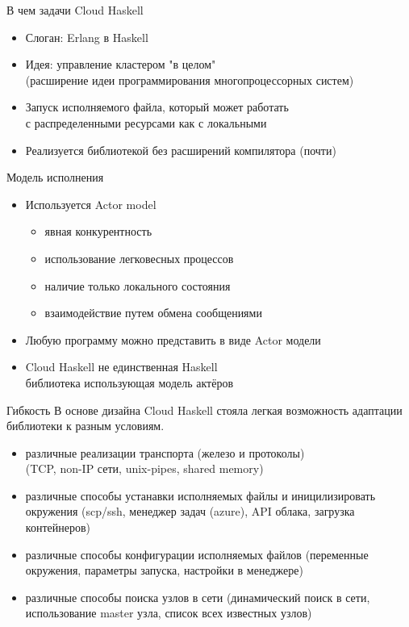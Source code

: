 \documentclass{beamer}
\begin{document}
\begin{frame}{В чем задачи Cloud Haskell}
  \begin{itemize}
    \item Слоган: Erlang в Haskell
    \item Идея: управление кластером "в целом" \\
          (расширение идеи программирования многопроцессорных систем)
    \item Запуск исполняемого файла, который может работать \\
          с распределенными ресурсами как с локальными
    \item Реализуется библиотекой без расширений компилятора (почти)
  \end{itemize}
\end{frame}

\begin{frame}{Модель исполнения}
  \begin{itemize}
    \item Используется Actor model
      \begin{itemize}
        \item явная конкурентность
        \item использование легковесных процессов
        \item наличие только локального состояния
        \item взаимодействие путем обмена сообщениями
      \end{itemize}
    \item Любую программу можно представить в виде Actor модели
    \item Cloud Haskell не единственная Haskell \\
          библиотека использующая модель актёров
  \end{itemize}
\end{frame}

\begin{frame}{Гибкость}
  В основе дизайна Cloud Haskell стояла легкая возможность
  адаптации библиотеки к разным условиям.
  \begin{itemize}
    \item различные реализации транспорта (железо и протоколы) \\
          (TCP, non-IP сети, unix-pipes, shared memory)
    \item различные способы устанавки исполняемых файлы и иницилизировать
          окружения
          (scp/ssh, менеджер задач (azure), API облака, загрузка контейнеров)
    \item различные способы конфигурации исполняемых файлов
          (переменные окружения, параметры запуска, настройки в менеджере)
    \item различные способы поиска узлов в сети
          (динамический поиск в сети, использование master узла, список всех
          известных узлов)
  \end{itemize}
\end{frame}
\end{document}
